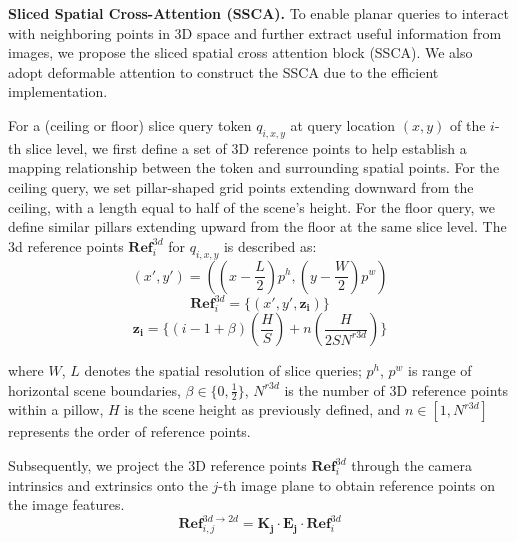 \documentclass[letterpaper, 10 pt, conference]{ieeeconf}  %
\begin{document}
\textbf{Sliced Spatial Cross-Attention (SSCA).} To enable planar queries to interact with neighboring points in 3D space and further extract useful information from images, we propose the sliced spatial cross attention block (SSCA). We also adopt deformable attention to construct the SSCA due to the efficient implementation.

For a (ceiling or floor) slice query token $q_{i,x,y}$ at query location $(x, y)$ of the $i$-th slice level, we first define a set of 3D reference points to help establish a mapping relationship between the token and surrounding spatial points. For the ceiling query, we set pillar-shaped grid points extending downward from the ceiling, with a length equal to half of the scene's height. For the floor query, we define similar pillars extending upward from the floor at the same slice level. The 3d reference points $\mathbf{Ref}_i^{3d}$ for $q_{i,x,y}$ is described as:
\vspace{-3pt}
\begin{equation}
    (x', y') = ((x - \frac{L}{2}) p^h, (y - \frac{W}{2}) p^w)
\end{equation}
\vspace{-10pt}
\begin{equation}
    \mathbf{Ref}_i^{3d} = \{ (x', y', \mathbf{z_{i}}) \}
\end{equation}
\vspace{-10pt}
\begin{equation}
     \mathbf{z_{i}} = \{ (i-1+\beta )(\frac{H}{S}) + n(\frac{H}{2SN^{r3d}}) \}
\end{equation}



\noindent where $W$, $L$ denotes the spatial resolution of slice queries; $p^h$, $p^w$ is range of horizontal scene boundaries, $\beta \in \{0, \frac{1}{2}\}$, $N^{r3d}$ is the number of 3D reference points within a pillow, $H$ is the scene height as previously defined, and $n \in [1, N^{r3d}]$ represents the order of reference points. 

Subsequently, we project the 3D reference points $\mathbf{Ref}_i^{3d}$ through the camera intrinsics and extrinsics onto the $j$-th image plane to obtain reference points on the image features.
\vspace{-6pt}
\begin{equation}
    \mathbf{Ref}_{i,j}^{3d \xrightarrow{}2d} = \mathbf{K_j} \cdot \mathbf{E_j} \cdot \mathbf{Ref}_i^{3d} 
\end{equation}
\end{document}
